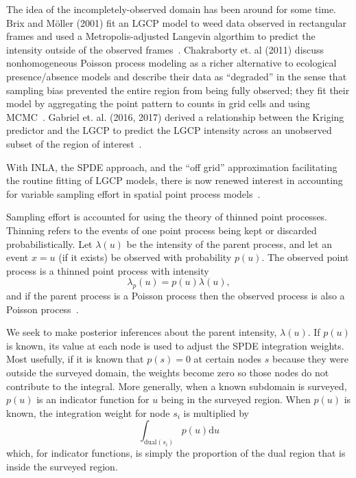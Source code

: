 \documentclass[]{interact}
\begin{document}
The idea of the incompletely-observed domain has been around for some time.
Brix and M\"{o}ller (2001) fit an LGCP model to weed data observed in
rectangular frames and used a Metropolis-adjusted Langevin algorthim
to predict the intensity outside of the observed frames~\cite{brixmoeller}.
Chakraborty et. al (2011) discuss nonhomogeneous Poisson process modeling as
a richer alternative to ecological presence/absence models and describe their
data as ``degraded'' in the sense that sampling bias prevented the entire
region from being fully observed; they fit their model by aggregating the
point pattern to counts in grid cells and using MCMC~\cite{chakrabortyetal}.
Gabriel et. al. (2016, 2017) derived a relationship between the Kriging
predictor and the LGCP to predict the LGCP intensity across an unobserved
subset of the region of interest~\cite{gabrieletal2016, gabrieletal2017}.

With INLA, the SPDE approach, and the ``off grid'' approximation
facilitating the routine fitting of LGCP models, there is now renewed interest
in accounting for variable sampling effort in spatial point process
models~\cite{simpsonetal,yuanetal}.

Sampling effort is accounted for using the theory of thinned point processes.
Thinning refers to the events of one point process being kept or discarded
probabilistically. Let \(\lambda(u)\) be the intensity of the parent process,
and let an event \(x=u\) (if it exists) be observed with probability
\(p(u)\). The observed point process is a thinned point process with
intensity
\begin{displaymath}
\lambda_{p}(u) = p(u) \lambda(u),
\end{displaymath}
and if the parent process is a Poisson process then the observed process is
also a Poisson process~\cite{moellerbook}.

We seek to make posterior inferences about the parent intensity,
\(\lambda(u)\). If \(p(u)\) is known, its value at each node is used to
adjust the SPDE integration weights. Most usefully, if it is known that
\(p(s) = 0\) at certain nodes \(s\) because they were outside the surveyed
domain, the weights become zero so those nodes do not contribute to the
integral. More generally, when a known subdomain is surveyed, \(p(u)\) is
an indicator function for \(u\) being in the surveyed region. When \(p(u)\)
is known, the integration weight for node \(s_{i}\) is multiplied by
\begin{displaymath}
\int_{\mathrm{dual}(s_{i})} p(u) \mathrm{d}u
\end{displaymath}
which, for indicator functions, is simply the proportion of the dual region
that is inside the surveyed region.
\end{document}
